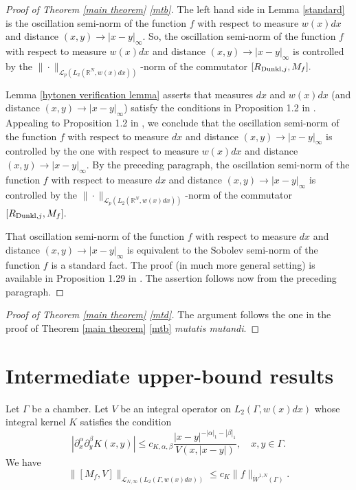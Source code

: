 \documentclass{amsart}
\numberwithin{equation}{section}
\begin{document}
\begin{proof}[Proof of Theorem \ref{main theorem} \eqref{mtb}] The left hand side in Lemma \ref{standard} is the oscillation semi-norm of the function $f$ with respect to measure $w(x)dx$ and distance $(x,y)\to |x-y|_{\infty}.$ So, the oscillation semi-norm of the function $f$ with respect to measure $w(x)dx$ and distance $(x,y)\to |x-y|_{\infty}$ is controlled by the $\|\cdot\|_{\mathcal{L}_p(L_2(\mathbb{R}^N,w(x)dx))}$-norm of the commutator $[R_{{\rm Dunkl},j},M_f].$

Lemma \ref{hytonen verification lemma} asserts that measures $dx$ and $w(x)dx$ (and distance $(x,y)\to |x-y|_{\infty}$) satisfy the conditions in Proposition 1.2 in \cite{Hytonen-new}. Appealing to Proposition 1.2 in \cite{Hytonen-new}, we conclude that the oscillation semi-norm of the function $f$ with respect to measure $dx$ and distance $(x,y)\to |x-y|_{\infty}$ is controlled by the one with respect to measure $w(x)dx$ and distance $(x,y)\to |x-y|_{\infty}.$ By the preceding paragraph, the oscillation semi-norm of the function $f$ with respect to measure $dx$ and distance $(x,y)\to |x-y|_{\infty}$ is controlled by the $\|\cdot\|_{\mathcal{L}_p(L_2(\mathbb{R}^N,w(x)dx))}$-norm of the commutator $[R_{{\rm Dunkl},j},M_f].$

That oscillation semi-norm of the function $f$ with respect to measure $dx$ and distance $(x,y)\to |x-y|_{\infty}$ is equivalent to the Sobolev semi-norm of the function $f$ is a standard fact. The proof (in much more general setting) is available in Proposition 1.29 in \cite{HKarxiv}. The assertion follows now from the preceding paragraph. 
\end{proof}

\begin{proof}[Proof of Theorem \ref{main theorem} \eqref{mtd}] The argument follows the one in the proof of Theorem \ref{main theorem} \eqref{mtb} {\it mutatis mutandi}.
\end{proof}

\section{Intermediate upper-bound results}

\begin{theorem} Let $\Gamma$ be a chamber. Let $V$ be an integral operator on $L_2(\Gamma,w(x)dx)$ whose integral kernel $K$ satisfies the condition
$$|\partial_x^{\alpha}\partial_y^{\beta}K(x,y)|\leq c_{K,\alpha,\beta}\frac{|x-y|^{-|\alpha|_1-|\beta|_1}}{V(x,|x-y|)},\quad x,y\in\Gamma.$$
We have
$$\|[M_f,V]\|_{\mathcal{L}_{N,\infty}(L_2(\Gamma,w(x)dx))}\leq c_K\|f\|_{\dot{W}^{1,N}(\Gamma)}.$$
\end{theorem}
\end{document}
